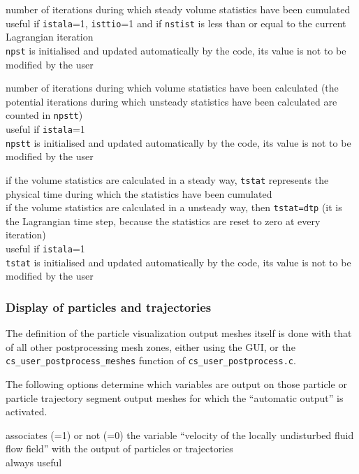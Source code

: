 {number of iterations during which steady volume statistics have
been cumulated\\
useful if \texttt{istala}=1, \texttt{isttio}=1 and if \texttt{nstist} is
less than or equal to the current Lagrangian iteration\\
\texttt{npst} is initialised and updated automatically by the code, its
value is not to be modified by the user}

{number of iterations during which volume statistics have been
calculated (the potential iterations during which unsteady
statistics have been calculated are counted in \texttt{npstt})\\
useful if \texttt{istala}=1\\
\texttt{npstt} is initialised and updated automatically by the code,
its value is not to be modified by the user}

{if the volume statistics are calculated in a steady way, \texttt{tstat}
represents the physical time during which the statistics have been cumulated\\
if the volume statistics are calculated in a unsteady way,
then \texttt{tstat=dtp} (it is the Lagrangian time step, because the
statistics are reset to zero at every iteration)\\
useful if \texttt{istala}=1\\
\texttt{tstat} is initialised and updated automatically by the code,
its value is not to be modified by the user}

\subsubsection{Display of particles and trajectories}

The definition of the particle visualization output meshes
itself is done with that of all other postprocessing mesh zones, either
using the GUI, or the \texttt{cs\_user\_postprocess\_meshes} function of
\texttt{cs\_user\_postprocess.c}.

The following options determine which variables are output on those particle
or particle trajectory segment output meshes for which the ``automatic output''
is activated.

{associates (=1) or not (=0) the variable ``velocity of the locally
undisturbed fluid flow field'' with the output of particles or trajectories\\
always useful}


